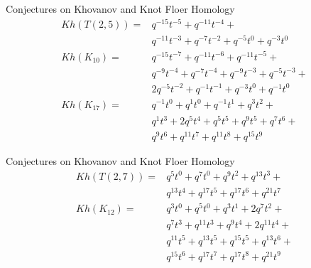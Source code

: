 \documentclass{beamer}
\begin{document}
    \begin{frame}{Conjectures on Khovanov and Knot Floer Homology}
        \begin{align}
            Kh(T(2,5))=&q^{-15}t^{-5}+q^{-11}t^{-4}+\nonumber\\
                &q^{-11}t^{-3}+q^{-7}t^{-2}+q^{-5}t^{0}+q^{-3}t^{0}\\
            Kh(K_{10})=&q^{-15}t^{-7}+q^{-11}t^{-6}+q^{-11}t^{-5}+\nonumber\\
                &q^{-9}t^{-4}+q^{-7}t^{-4}+q^{-9}t^{-3}+q^{-5}t^{-3}+\nonumber\\
                &2q^{-5}t^{-2}+q^{-1}t^{-1}+q^{-3}t^{0}+q^{-1}t^{0}\\
            Kh(K_{17})=&q^{-1}t^{0}+q^{1}t^{0}+q^{-1}t^{1}+q^{3}t^{2}+\nonumber\\
                &q^{1}t^{3}+2q^{5}t^{4}+q^{5}t^{5}+q^{9}t^{5}+q^{7}t^{6}+\nonumber\\
                &q^{9}t^{6}+q^{11}t^{7}+q^{11}t^{8}+q^{15}t^{9}
        \end{align}
    \end{frame}
    \begin{frame}{Conjectures on Khovanov and Knot Floer Homology}
        \begin{align}
            Kh(T(2,7))=&q^{5}t^{0}+q^{7}t^{0}+q^{9}t^{2}+q^{13}t^{3}+\nonumber\\
                &q^{13}t^{4}+q^{17}t^{5}+q^{17}t^{6}+q^{21}t^{7}\\
            Kh(K_{12})=&q^{3}t^{0}+q^{5}t^{0}+q^{3}t^{1}+2q^{7}t^{2}+\nonumber\\
                &q^{7}t^{3}+q^{11}t^{3}+q^{9}t^{4}+2q^{11}t^{4}+\nonumber\\
                &q^{11}t^{5}+q^{13}t^{5}+q^{15}t^{5}+q^{13}t^{6}+\nonumber\\
                &q^{15}t^{6}+q^{17}t^{7}+q^{17}t^{8}+q^{21}t^{9}
        \end{align}
    \end{frame}
\end{document}
